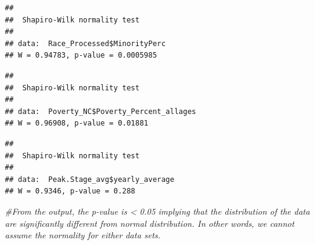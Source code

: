 \documentclass[12pt,]{article}
\newenvironment{Shaded}{\begin{snugshade}}{\end{snugshade}}
\newcommand{\KeywordTok}[1]{\textcolor[rgb]{0.13,0.29,0.53}{\textbf{#1}}}
\newcommand{\DataTypeTok}[1]{\textcolor[rgb]{0.13,0.29,0.53}{#1}}
\newcommand{\StringTok}[1]{\textcolor[rgb]{0.31,0.60,0.02}{#1}}
\newcommand{\CommentTok}[1]{\textcolor[rgb]{0.56,0.35,0.01}{\textit{#1}}}
\newcommand{\OperatorTok}[1]{\textcolor[rgb]{0.81,0.36,0.00}{\textbf{#1}}}
\newcommand{\NormalTok}[1]{#1}
\begin{document}
\begin{verbatim}
## 
##  Shapiro-Wilk normality test
## 
## data:  Race_Processed$MinorityPerc
## W = 0.94783, p-value = 0.0005985
\end{verbatim}

\begin{Shaded}
\end{Shaded}

\begin{verbatim}
## 
##  Shapiro-Wilk normality test
## 
## data:  Poverty_NC$Poverty_Percent_allages
## W = 0.96908, p-value = 0.01881
\end{verbatim}

\begin{Shaded}
\end{Shaded}

\begin{verbatim}
## 
##  Shapiro-Wilk normality test
## 
## data:  Peak.Stage_avg$yearly_average
## W = 0.9346, p-value = 0.288
\end{verbatim}

\begin{Shaded}
\begin{Highlighting}[]
\CommentTok{#From the output, the p-value is < 0.05 implying that the distribution of the data are significantly different from normal distribution. In other words, we cannot assume the normality for either data sets.}
\end{Highlighting}
\end{Shaded}
\end{document}
